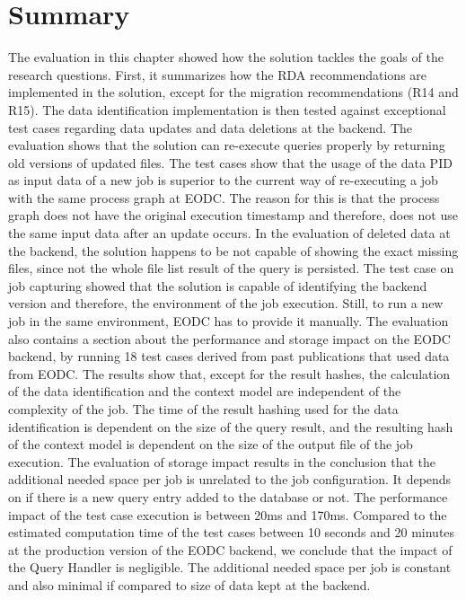 \documentclass[draft,final]{vutinfth} %
\begin{document}
\section{Summary}
The evaluation in this chapter showed how the solution tackles the goals of the research questions. First, it summarizes how the RDA recommendations are implemented in the solution, except for the migration recommendations (R14 and R15). The data identification implementation is then tested against exceptional test cases regarding data updates and data deletions at the backend. The evaluation shows that the solution can re-execute queries properly by returning old versions of updated files. The test cases show that the usage of the data PID as input data of a new job is superior to the current way of re-executing a job with the same process graph at EODC.
The reason for this is that the process graph does not have the original execution timestamp and therefore, does not use the same input data after an update occurs. In the evaluation of deleted data at the backend, the solution happens to be not capable of showing the exact missing files, since not the whole file list result of the query is persisted. The test case on job capturing showed that the solution is capable of identifying the backend version and therefore, the environment of the job execution. Still, to run a new job in the same environment, EODC has to provide it manually. The evaluation also contains a section about the performance and storage impact on the EODC backend, by running 18 test cases derived from past publications that used data from EODC. The results show that, except for the result hashes, the calculation of the data identification and the context model are independent of the complexity of the job. The time of the result hashing used for the data identification is dependent on the size of the query result, and the resulting hash of the context model is dependent on the size of the output file of the job execution. The evaluation of storage impact results in the conclusion that the additional needed space per job is unrelated to the job configuration. It depends on if there is a new query entry added to the database or not. The performance impact of the test case execution is between 20ms and 170ms. Compared to the estimated computation time of the test cases between 10 seconds and 20 minutes at the production version of the EODC backend, we conclude that the impact of the Query Handler is negligible. The additional needed space per job is constant and also minimal if compared to size of data kept at the backend.
   
\end{document}
